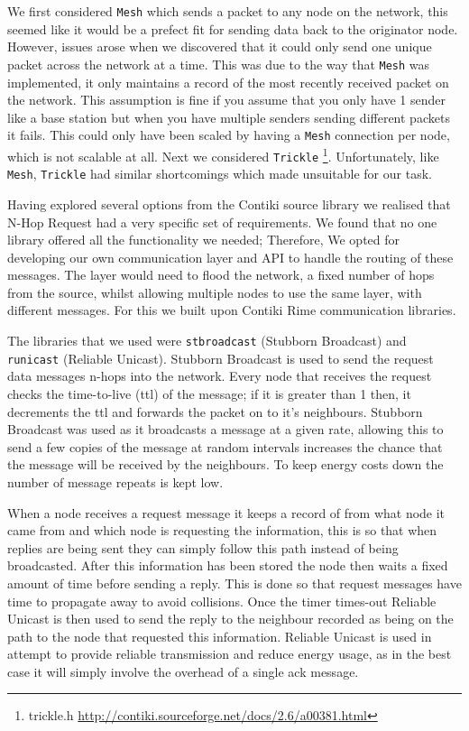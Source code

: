 We first considered \verb|Mesh| which sends a packet to any node on the network, this seemed like it would be a prefect fit for sending data back to the originator node. However, issues arose when we discovered that it could only send one unique packet across the network at a time. This was due to the way that \verb|Mesh| was implemented, it only maintains a record of the most recently received packet on the network. This assumption is fine if you assume that you only have 1 sender like a base station but when you have multiple senders sending different packets it fails. This could only have been scaled by having a \verb|Mesh| connection per node, which is not scalable at all. Next we considered \verb|Trickle| \footnote{trickle.h \url{http://contiki.sourceforge.net/docs/2.6/a00381.html}}. Unfortunately, like \verb|Mesh|, \verb|Trickle| had similar shortcomings which made unsuitable for our task.

Having explored several options from the Contiki source library we realised that N-Hop Request had a very specific set of requirements. We found that no one library offered all the functionality we needed; Therefore, We opted for developing our own communication layer and API to handle the routing of these messages. The layer would need to flood the network, a fixed number of hops from the source, whilst allowing multiple nodes to use the same layer, with different messages. For this we built upon Contiki Rime communication libraries.

The libraries that we used were \verb|stbroadcast| (Stubborn Broadcast) and \verb|runicast| (Reliable Unicast). Stubborn Broadcast is used to send the request data messages n-hops into the network. Every node that receives the request checks the time-to-live (ttl) of the message; if it is greater than 1 then, it decrements the ttl and forwards the packet on to it's neighbours. Stubborn Broadcast was used as it broadcasts a message at a given rate, allowing this to send a few copies of the message at random intervals increases the chance that the message will be received by the neighbours. To keep energy costs down the number of message repeats is kept low.

When a node receives a request message it keeps a record of from what node it came from and which node is requesting the information, this is so that when replies are being sent they can simply follow this path instead of being broadcasted. After this information has been stored the node then waits a fixed amount of time before sending a reply. This is done so that request messages have time to propagate away to avoid collisions. Once the timer times-out Reliable Unicast is then used to send the reply to the neighbour recorded as being on the path to the node that requested this information. Reliable Unicast is used in attempt to provide reliable transmission and reduce energy usage, as in the best case it will simply involve the overhead of a single ack message.

